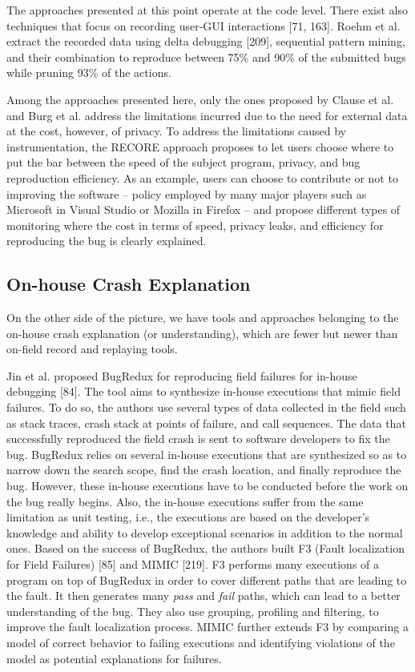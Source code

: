 \documentclass[12pt]{report}
\begin{document}
The approaches presented at this point operate at the code level. There
exist also techniques that focus on recording user-GUI interactions
{[}71, 163{]}. Roehm et al. extract the recorded data using delta
debugging {[}209{]}, sequential pattern mining, and their combination to
reproduce between 75\% and 90\% of the submitted bugs while pruning 93\%
of the actions.

Among the approaches presented here, only the ones proposed by Clause et
al. and Burg et al. address the limitations incurred due to the need for
external data at the cost, however, of privacy. To address the
limitations caused by instrumentation, the RECORE approach proposes to
let users choose where to put the bar between the speed of the subject
program, privacy, and bug reproduction efficiency. As an example, users
can choose to contribute or not to improving the software -- policy
employed by many major players such as Microsoft in Visual Studio or
Mozilla in Firefox -- and propose different types of monitoring where
the cost in terms of speed, privacy leaks, and efficiency for
reproducing the bug is clearly explained.

\subsection{On-house Crash
Explanation}\label{on-house-crash-explanation}

On the other side of the picture, we have tools and approaches belonging
to the on-house crash explanation (or understanding), which are fewer
but newer than on-field record and replaying tools.

Jin et al. proposed BugRedux for reproducing field failures for in-house
debugging {[}84{]}. The tool aims to synthesize in-house executions that
mimic field failures. To do so, the authors use several types of data
collected in the field such as stack traces, crash stack at points of
failure, and call sequences. The data that successfully reproduced the
field crash is sent to software developers to fix the bug. BugRedux
relies on several in-house executions that are synthesized so as to
narrow down the search scope, find the crash location, and finally
reproduce the bug. However, these in-house executions have to be
conducted before the work on the bug really begins. Also, the in-house
executions suffer from the same limitation as unit testing, i.e., the
executions are based on the developer's knowledge and ability to develop
exceptional scenarios in addition to the normal ones. Based on the
success of BugRedux, the authors built F3 (Fault localization for Field
Failures) {[}85{]} and MIMIC {[}219{]}. F3 performs many executions of a
program on top of BugRedux in order to cover different paths that are
leading to the fault. It then generates many \emph{pass} and \emph{fail}
paths, which can lead to a better understanding of the bug. They also
use grouping, profiling and filtering, to improve the fault localization
process. MIMIC further extends F3 by comparing a model of correct
behavior to failing executions and identifying violations of the model
as potential explanations for failures.
\end{document}
